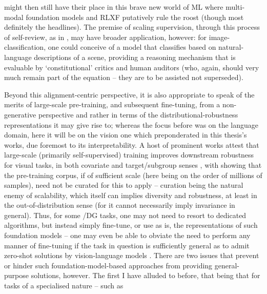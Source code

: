 might then still have their place in this brave new world of ML where multi-modal foundation models
\citep{driess2023palm, huang2023language, openai2023gpt4, katz2023gpt} and RLXF putatively rule the
roost (though most definitely the headlines).
%
The premise of scaling supervision, through this process of self-review, as in
\cite{bai2022constitutional}, may have broader application, however: for image-classification, one
could conceive of a model that classifies based on natural-language descriptions of a scene,
providing a reasoning mechanism that is evaluable by `constitutional' critics and human auditors
(who, again, should very much remain part of the equation -- they are to be assisted not
superseded).
%

%
Beyond this alignment-centric perspective, it is also appropriate to speak of the merits of
large-scale pre-training, and subsequent fine-tuning, from a non-generative perspective and rather
in terms of the distributional-robustness representations it may give rise to; whereas the focus
before was on the language domain, here it will be on the vision one which preponderated in this
thesis's works, due foremost to its interpretability.
%
A host of prominent works attest that large-scale (primarily self-supervised) training improves
downstream robustness for visual tasks, in both covariate \citep{hendrycks2019using,
hendrycks2020pretrained, radford2021learning} and target/subgroup senses \citep{liu2021self,
goyal2022vision}, with \cite{goyal2022vision} showing that the pre-training corpus, if of
sufficient scale (here being on the order of millions of samples), need not be curated for this to
apply -- curation being the natural enemy of scalability, which itself can implies diversity and
robustness, at least in the out-of-distribution sense (for it cannot  necessarily imply invariance
in general).
%
Thus, for some \ood{}/\ac{DG} tasks, one may not need to resort to dedicated algorithms, but instead
simply fine-tune, or use as is, the representations of such foundation models -- one may even be
able to obviate the need to perform any manner of fine-tuning if the task in question is
sufficiently general as to admit zero-shot solutions by vision-language models
\citep{radford2021learning, alayrac2022flamingo}.
%
There are two issues that prevent or hinder such foundation-model-based approaches from providing
general-purpose solutions, however. 
%
The first I have alluded to before, that being that for tasks of a specialised nature -- such as
